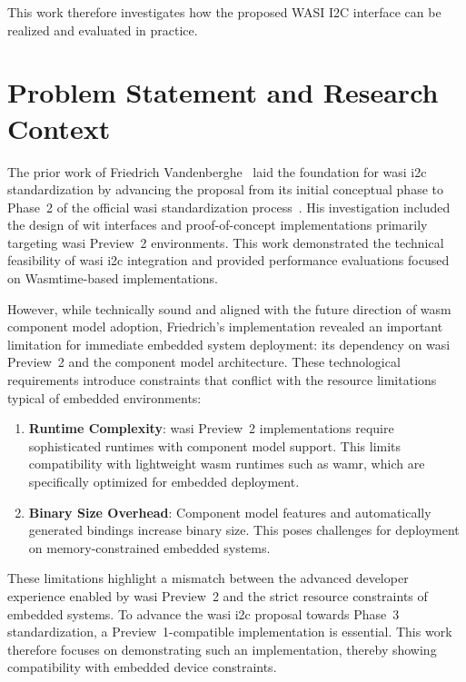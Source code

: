 This work therefore investigates how the proposed WASI I2C interface can be realized and evaluated in practice.






\section{Problem Statement and Research Context}
\label{sec:problem-statement}

The prior work of Friedrich Vandenberghe~\cite{friedrich_paper} laid the foundation for \acrshort{wasi} \acrshort{i2c} standardization by advancing the proposal from its initial conceptual phase to Phase~2 of the official \acrshort{wasi} standardization process~\cite{wasi_phases}. His investigation included the design of \acrshort{wit} interfaces and proof-of-concept implementations primarily targeting \acrshort{wasi} Preview~2 environments. This work demonstrated the technical feasibility of \acrshort{wasi} \acrshort{i2c} integration and provided performance evaluations focused on Wasmtime-based implementations.

However, while technically sound and aligned with the future direction of \acrshort{wasm} component model adoption, Friedrich's implementation revealed an important limitation for immediate embedded system deployment: its dependency on \acrshort{wasi} Preview~2 and the component model architecture. These technological requirements introduce constraints that conflict with the resource limitations typical of embedded environments:

\begin{enumerate}
    \item \textbf{Runtime Complexity}: \acrshort{wasi} Preview~2 implementations require sophisticated runtimes with component model support. This limits compatibility with lightweight \acrshort{wasm} runtimes such as \acrfull{wamr}, which are specifically optimized for embedded deployment.
    
    \item \textbf{Binary Size Overhead}: Component model features and automatically generated bindings increase binary size. This poses challenges for deployment on memory-constrained embedded systems.
\end{enumerate}

These limitations highlight a mismatch between the advanced developer experience enabled by \acrshort{wasi} Preview~2 and the strict resource constraints of embedded systems. To advance the \acrshort{wasi} \acrshort{i2c} proposal towards Phase~3 standardization, a Preview~1-compatible implementation is essential. This work therefore focuses on demonstrating such an implementation, thereby showing compatibility with embedded device constraints.




